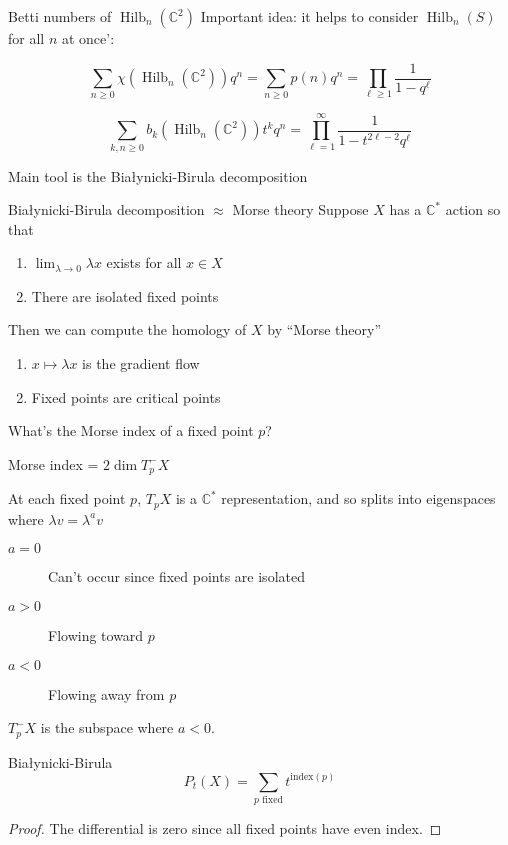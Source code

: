 \documentclass{beamer}
\DeclareMathOperator{\Hilb}{Hilb}
\newcommand{\C}{\mathbb{C}}
\begin{document}
\begin{frame}{Betti numbers of $\Hilb_n(\C^2)$}
Important idea: it helps to consider $\Hilb_n(S)$ for all $n$ at once':

\begin{Theorem}[Warm-up]
$$\sum_{n\geq 0} \chi(\Hilb_n(\C^2))q^n=\sum_{n\geq0} p(n)q^n=\prod_{\ell\geq 1} \frac{1}{1-q^\ell}$$
\end{Theorem}


\begin{theorem}
$$\sum_{k,n \geq 0} b_k(\Hilb_n(\C^2))t^k q^n=\prod_{\ell=1}^\infty \frac{1}{1-t^{2\ell-2}q^\ell}$$
\end{theorem}

Main tool is the \alert{Bia\l ynicki-Birula decomposition}
\end{frame}


\begin{frame}{Bia\l ynicki-Birula decomposition $\approx$ Morse theory}
Suppose $X$ has a $\C^*$ action so that

\begin{enumerate}
\item $\lim_{\lambda\to 0} \lambda x$ exists for all $x\in X$
\item There are isolated fixed points
\end{enumerate}

Then we can compute the homology of $X$ by ``Morse theory''
\begin{enumerate}
\item $x\mapsto\lambda x$ is the gradient flow
\item Fixed points are critical points
\end{enumerate}

\begin{block}{What's the Morse index of a fixed point $p$?}
\end{block}
\end{frame}



\begin{frame}{Morse index = $2\dim T^-_pX$}

At each fixed point $p$, $T_pX$ is a $\C^*$ representation, and so splits into eigenspaces where $\lambda v=\lambda^a v$

\begin{description}
\item[$a=0$] Can't occur since fixed points are isolated
\item[$a>0$]  Flowing toward $p$
\item [$a<0$] Flowing away from $p$ 
\end{description}
$T^-_pX$ is the subspace where $a<0$.

\begin{Theorem}{Bia\l ynicki-Birula}
$$P_t(X)=\sum_{p\textrm{ fixed}} t^{\textrm{index}(p)}$$
\end{Theorem}
\begin{proof}
The differential is zero since all fixed points have even index.
\end{proof}
\end{frame}
\end{document}
